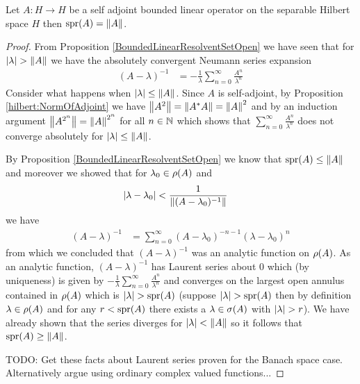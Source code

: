 \begin{prop}\label{hilbert:SpectralRadiusSelfAdjoint}Let $A : H \to H$ be a self adjoint bounded linear operator on the separable Hilbert space $H$ then $\operatorname*{spr}(A) = \left \lVert A \right \rVert$.
\end{prop}
\begin{proof}
From Proposition \ref {BoundedLinearResolventSetOpen} we have seen that for $\left \vert \lambda \right \vert > \left \lVert A \right \rVert$ we have the absolutely convergent Neumann series expansion
\begin{align*}
(A - \lambda)^{-1} &= -\frac{1}{\lambda} \sum_{n=0}^\infty \frac{A^n}{\lambda^n}
\end{align*}
Consider what happens when $\left \vert \lambda \right \vert \leq \left \lVert A \right \rVert$.  Since $A$ is self-adjoint, by Proposition \ref{hilbert:NormOfAdjoint} we have $\left \lVert A^2 \right \rVert = \left \lVert {A}^*A \right \rVert = \left \lVert A \right \rVert^2$ and by an induction argument $\left \lVert A^{2^n} \right \rVert = \left \lVert A \right \rVert^{2^n}$ for all $n \in \mathbb{N}$ which shows that $\sum_{n=0}^\infty \frac{A^n}{\lambda^n}$  does not converge absolutely for $\left \vert \lambda \right \vert \leq \left \lVert A \right \rVert$.  

By Proposition \ref {BoundedLinearResolventSetOpen} we know that $\operatorname*{spr}(A) \leq \left \lVert A \right \rVert$ and moreover we showed that for $\lambda_0 \in \rho(A)$ and 
\begin{align*}
\left \vert \lambda - \lambda_0 \right \vert  &< \frac{1}{\left \lVert (A-\lambda_0)^{-1} \right \rVert}
\end{align*}
we have 
\begin{align*}
(A - \lambda)^{-1} &= \sum_{n=0}^\infty (A- \lambda_0)^{-n-1} (\lambda - \lambda_0)^n
\end{align*}
from which we concluded that $(A - \lambda)^{-1}$ was an analytic function on $\rho(A)$.  As an analytic function, $(A - \lambda)^{-1}$ has Laurent series about $0$ which (by uniqueness) is given by $-\frac{1}{\lambda} \sum_{n=0}^\infty \frac{A^n}{\lambda^n}$ and converges on the largest open annulus contained in $\rho(A)$ which is $\left \vert \lambda \right \vert > \operatorname*{spr}(A)$ (suppose $\left \vert \lambda \right \vert >  \operatorname*{spr}(A)$ then by definition  $\lambda \in \rho(A)$ and for any $r < \operatorname*{spr}(A)$ there exists a $\lambda \in \sigma(A)$ with $\left \vert \lambda \right \vert > r$).  We have already shown that the series diverges for $\left \vert \lambda \right \vert < \left \lVert A \right \rVert$ so it follows that $\operatorname*{spr}(A) \geq \left \lVert A \right \rVert$.   

TODO:  Get these facts about Laurent series proven for the Banach space case.  Alternatively argue using ordinary complex valued functions...
\end{proof}

